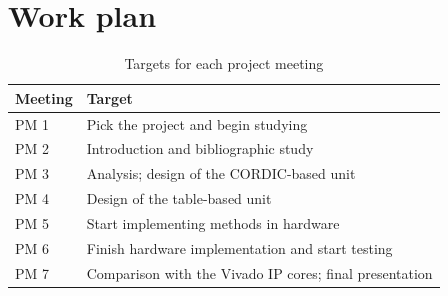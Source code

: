 \section{Work plan}
\label{sec:workplan}

\begin{table}[H]
  \centering
  \caption{Targets for each project meeting}
  \label{tab:workplan}
  \begin{tabularx}{\textwidth}{lX}
    \toprule
    Meeting & Target \\
    \midrule
    PM 1 & Pick the project and begin studying \\
    PM 2 & Introduction and bibliographic study \\
    PM 3 & Analysis; design of the CORDIC-based unit \\
    PM 4 & Design of the table-based unit \\
    PM 5 & Start implementing methods in hardware \\
    PM 6 & Finish hardware implementation and start testing \\
    PM 7 & Comparison with the Vivado IP cores; final presentation \\
    \bottomrule
  \end{tabularx}
\end{table}